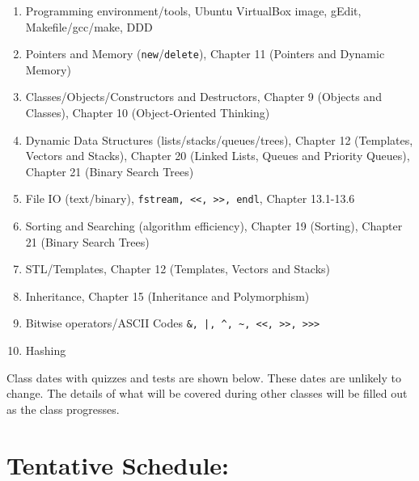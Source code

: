 \documentclass[11pt]{article}
\begin{document}
\begin{enumerate}
\item Programming environment/tools, Ubuntu VirtualBox image, gEdit, Makefile/gcc/make, DDD
\item Pointers and Memory (\lstinline$new$/\lstinline$delete$),
  Chapter 11 (Pointers and Dynamic Memory)
\item Classes/Objects/Constructors and Destructors, Chapter 9 (Objects
  and Classes), Chapter 10 (Object-Oriented Thinking)
\item Dynamic Data Structures (lists/stacks/queues/trees), Chapter 12
  (Templates, Vectors and Stacks), Chapter 20 (Linked Lists, Queues
  and Priority Queues), Chapter 21 (Binary Search Trees)
\item File IO (text/binary), \lstinline$fstream, <<, >>, endl$, Chapter 13.1-13.6
\item Sorting and Searching (algorithm efficiency), Chapter 19
  (Sorting), Chapter 21 (Binary Search Trees)
\item STL/Templates, Chapter 12 (Templates, Vectors and Stacks)
\item Inheritance, Chapter 15 (Inheritance and Polymorphism)
\item Bitwise operators/ASCII Codes \lstinline$&, |, ^, ~, <<, >>, >>>$
\item Hashing
\end{enumerate}

Class dates with quizzes and tests are shown below.  These dates are
unlikely to change.  The details of what will be covered during other
classes will be filled out as the class progresses.


\section*{Tentative Schedule:}
\label{sec:sched}

\renewcommand{\calprintdate}{%
  \ifdefined\HCode
  {\HCode{<span class="calprintdate">}}
  \ifnewmonth\framebox{\textbf{\monthname\ \ordinaldate}}%
  \else \textbf{\ordinaldate}\fi
  {\HCode{</span>} }
  \else
  \ifnewmonth\framebox{\textbf{\monthname\ \ordinaldate}}%
  \else \textbf{\ordinaldate}\fi
  \fi
}

\renewcommand{\calprintclass}{%
  \ifdefined\HCode
  {\HCode{<span class="calprintclass">}}
  \textbf{\small\theclassnum}
  {\HCode{</span>} }
  \else
  \textbf{\small\theclassnum}
  \fi
}
\end{document}
